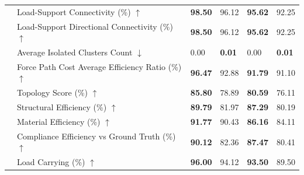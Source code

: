 \begin{table}[!h]
{\begin{tabular}{llll|ll}
 & Load-Support Connectivity (\%) $\uparrow$ & \textbf{98.50} & 96.12 & \textbf{95.62} & 92.25 \\
 & Load-Support Directional Connectivity (\%) $\uparrow$ & \textbf{98.50} & 96.12 & \textbf{95.62} & 92.25 \\
 & Average Isolated Clusters Count $\downarrow$ & 0.00 & \textbf{0.01} & 0.00 & \textbf{0.01} \\
 & Force Path Cost Average Efficiency Ratio (\%) $\uparrow$ & \textbf{96.47} & 92.88 & \textbf{91.79} & 91.10 \\
 & Topology Score (\%) $\uparrow$ & \textbf{85.80} & 78.89 & \textbf{80.59} & 76.11 \\
 & Structural Efficiency (\%) $\uparrow$ & \textbf{89.79} & 81.97 & \textbf{87.29} & 80.19 \\
 & Material Efficiency (\%) $\uparrow$ & \textbf{91.77} & 90.43 & \textbf{86.16} & 84.11 \\
 & Compliance Efficiency vs Ground Truth (\%) $\uparrow$ & \textbf{90.12} & 82.36 & \textbf{87.47} & 80.41 \\
 & Load Carrying (\%) $\uparrow$ & \textbf{96.00} & 94.12 & \textbf{93.50} & 89.50 \\
    \bottomrule
  \end{tabular}
  }
\end{table}